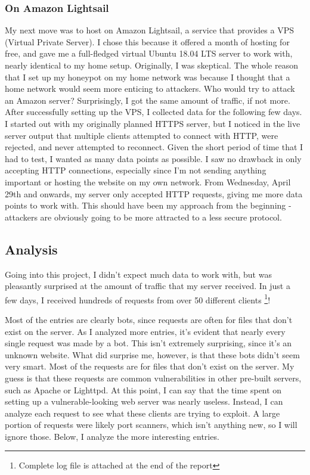 \documentclass[12pt]{article}
\begin{document}
\subsubsection{On Amazon Lightsail}
My next move was to host on Amazon Lightsail, a service that provides a VPS (Virtual Private Server).
I chose this because it offered a month of hosting for free, and gave me a full-fledged virtual Ubuntu 18.04 LTS server to work with, nearly identical to my home setup.
Originally, I was skeptical.
The whole reason that I set up my honeypot on my home network was because I thought that a home network would seem more enticing to attackers.
Who would try to attack an Amazon server?
Surprisingly, I got the same amount of traffic, if not more.
After successfully setting up the VPS, I collected data for the following few days.
I started out with my originally planned HTTPS server, but I noticed in the live server output that multiple clients attempted to connect with HTTP, were rejected, and never attempted to reconnect.
Given the short period of time that I had to test, I wanted as many data points as possible.
I saw no drawback in only accepting HTTP connections, especially since I'm not sending anything important or hosting the website on my own network.
From Wednesday, April 29th and onwards, my server only accepted HTTP requests, giving me more data points to work with.
This should have been my approach from the beginning - attackers are obviously going to be more attracted to a less secure protocol.


\subsection{Analysis}
Going into this project, I didn't expect much data to work with, but was pleasantly surprised at the amount of traffic that my server received.
In just a few days, I received hundreds of requests from over 50 different clients \footnote{Complete log file is attached at the end of the report}!

Most of the entries are clearly bots, since requests are often for files that don't exist on the server.
As I analyzed more entries, it's evident that nearly every single request was made by a bot.
This isn't extremely surprising, since it's an unknown website.
What did surprise me, however, is that these bots didn't seem very smart.
Most of the requests are for files that don't exist on the server.
My guess is that these requests are common vulnerabilities in other pre-built servers, such as Apache or Lighttpd.
At this point, I can say that the time spent on setting up a vulnerable-looking web server was nearly useless.
Instead, I can analyze each request to see what these clients are trying to exploit.
A large portion of requests were likely port scanners, which isn't anything new, so I will ignore those.
Below, I analyze the more interesting entries.
\end{document}
